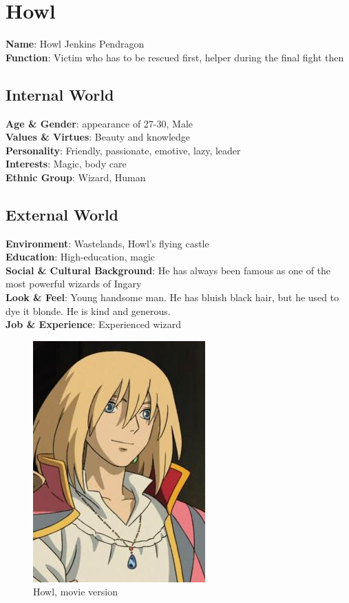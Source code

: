 \section{Howl}

\begin{minipage}{0.5\textwidth}
\textbf{Name}: Howl Jenkins Pendragon \\
\textbf{Function}: Victim who has to be rescued first, helper during the final fight then

\subsection{Internal World}

\textbf{Age \& Gender}: appearance of 27-30, Male \\
\textbf{Values \& Virtues}: Beauty and knowledge \\
\textbf{Personality}: Friendly, passionate, emotive, lazy, leader \\
\textbf{Interests}: Magic, body care \\
\textbf{Ethnic Group}: Wizard, Human

\subsection{External World}
\textbf{Environment}: Wastelands, Howl's flying castle \\
\textbf{Education}: High-education, magic \\
\textbf{Social \& Cultural Background}: He has always been famous as one of the most powerful wizards of Ingary \\
\textbf{Look \& Feel}: Young handsome man. He has bluish black hair, but he used to dye it blonde. He is kind and generous. \\
\textbf{Job \& Experience}: Experienced wizard \\

\end{minipage}%
%
\hfill\begin{minipage}{0.4\textwidth}
  \begin{figure}[H]
    \hfill\includegraphics{Images/Characters/howl_portrait}
    \caption{Howl, movie version}
  \end{figure}
\end{minipage}


